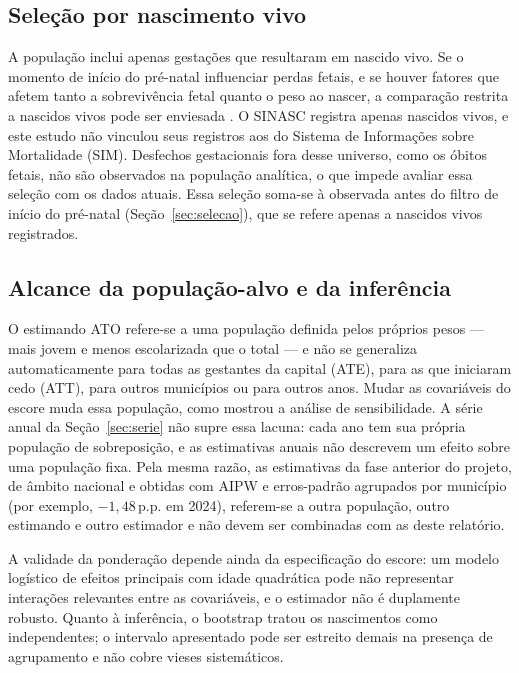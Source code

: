\documentclass[11pt,a4paper]{article}
\newcommand{\pp}{\,p.p.}
\begin{document}
\subsection{Seleção por nascimento vivo}\label{sec:selecao-nascido-vivo}

A população inclui apenas gestações que resultaram em nascido vivo. Se o momento de início
do pré-natal influenciar perdas fetais, e se houver fatores que afetem tanto a
sobrevivência fetal quanto o peso ao nascer, a comparação restrita a nascidos vivos pode
ser enviesada \cite{snowden2018}. O SINASC registra apenas nascidos vivos, e este estudo
não vinculou seus registros aos do Sistema de Informações sobre Mortalidade (SIM).
Desfechos gestacionais fora desse universo, como os óbitos fetais, não são observados na
população analítica, o que impede avaliar essa seleção com os dados atuais. Essa seleção
soma-se à observada antes do filtro de início do pré-natal (Seção~\ref{sec:selecao}), que
se refere apenas a nascidos vivos registrados.

\subsection{Alcance da população-alvo e da inferência}

O estimando ATO refere-se a uma população definida pelos próprios pesos --- mais jovem e
menos escolarizada que o total --- e não se generaliza automaticamente para todas as
gestantes da capital (ATE), para as que iniciaram cedo (ATT), para outros municípios ou
para outros anos. Mudar as covariáveis do escore muda essa população, como mostrou a
análise de sensibilidade. A série anual da Seção~\ref{sec:serie} não supre essa lacuna:
cada ano tem sua própria população de sobreposição, e as estimativas anuais não descrevem
um efeito sobre uma população fixa. Pela mesma razão, as estimativas da fase anterior do
projeto, de âmbito nacional e obtidas com AIPW e erros-padrão agrupados por município
(por exemplo, $-1{,}48$\pp{} em 2024), referem-se a outra população, outro estimando e
outro estimador e não devem ser combinadas com as deste relatório.

A validade da ponderação depende ainda da especificação do escore: um modelo logístico de
efeitos principais com idade quadrática pode não representar interações relevantes entre
as covariáveis, e o estimador não é duplamente robusto. Quanto à inferência, o bootstrap
tratou os nascimentos como independentes; o intervalo apresentado pode ser estreito demais
na presença de agrupamento e não cobre vieses sistemáticos.
\end{document}
